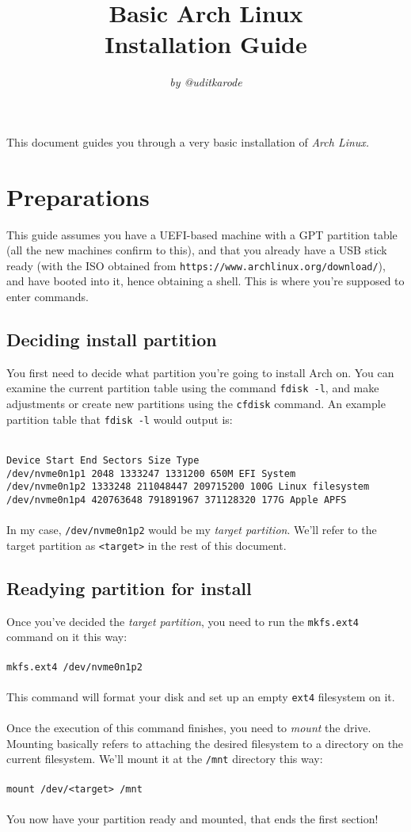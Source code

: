 \documentclass{article}
\author{\textit{by @uditkarode}}
\title{\textbf{Basic Arch Linux \\ Installation Guide}}
\begin{document}
\maketitle

This document guides you through a very basic installation of \textit{Arch Linux.}

\section{Preparations}
This guide assumes you have a UEFI-based machine with a GPT partition table (all the new machines confirm to this), and that you already have a USB stick ready (with the ISO obtained from \texttt{https://www.archlinux.org/download/}), and have booted into it, hence obtaining a shell. This is where you're supposed to enter commands.
\subsection{Deciding install partition}
You first need to decide what partition you're going to install Arch on. You can examine the current partition table using the command \texttt{fdisk -l}, and make adjustments or create new partitions using the \texttt{cfdisk} command. An example partition table that \texttt{fdisk -l} would output is:  

\texttt{
\\
Device             Start        End   Sectors  Size Type\\
/dev/nvme0n1p1      2048    1333247   1331200  650M EFI System\\
/dev/nvme0n1p2   1333248  211048447 209715200  100G Linux filesystem\\
/dev/nvme0n1p4 420763648  791891967 371128320  177G Apple APFS\\
}
\\
In my case, \texttt{/dev/nvme0n1p2} would be my \textit{target partition}. We'll refer to the target partition as \texttt{<target>} in the rest of this document.

\subsection{Readying partition for install}
Once you've decided the \textit{target partition}, you need to run the \texttt{mkfs.ext4} command on it this way:
\\\\
\texttt{mkfs.ext4 /dev/nvme0n1p2}
\\\\
This command will format your disk and set up an empty \texttt{ext4} filesystem on it.\\\\ Once the execution of this command finishes, you need to \textit{mount} the drive. Mounting basically refers to attaching the desired filesystem to a directory on the current filesystem. We'll mount it at the \texttt{/mnt} directory this way:
\\\\
\texttt{mount /dev/<target> /mnt}
\\\\
You now have your partition ready and mounted, that ends the first section!
\end{document}
